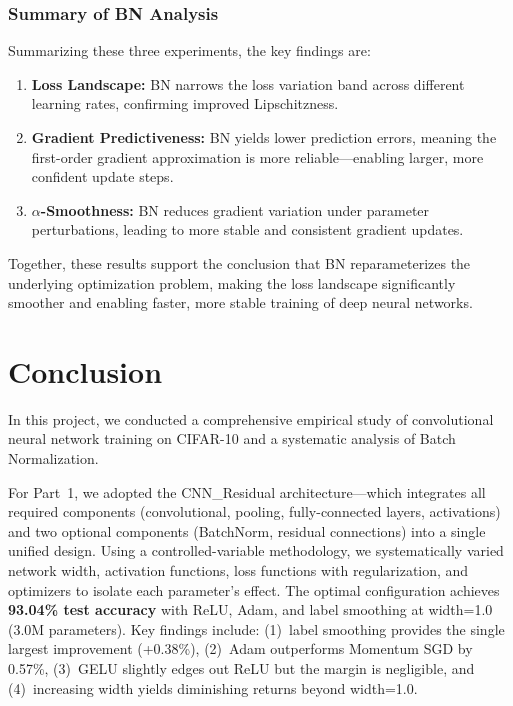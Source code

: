\documentclass[11pt,a4paper]{article}
\begin{document}
\subsubsection{Summary of BN Analysis}

Summarizing these three experiments, the key findings are:

\begin{enumerate}[nosep]
    \item \textbf{Loss Landscape:} BN narrows the loss variation band across different learning rates, confirming improved Lipschitzness.
    \item \textbf{Gradient Predictiveness:} BN yields lower prediction errors, meaning the first-order gradient approximation is more reliable---enabling larger, more confident update steps.
    \item \textbf{$\alpha$-Smoothness:} BN reduces gradient variation under parameter perturbations, leading to more stable and consistent gradient updates.
\end{enumerate}

Together, these results support the conclusion that BN reparameterizes the underlying optimization problem, making the loss landscape significantly smoother and enabling faster, more stable training of deep neural networks.


\section{Conclusion}

In this project, we conducted a comprehensive empirical study of convolutional neural network training on CIFAR-10 and a systematic analysis of Batch Normalization.

For Part~1, we adopted the CNN\_Residual architecture—which integrates all required components (convolutional, pooling, fully-connected layers, activations) and two optional components (BatchNorm, residual connections) into a single unified design. Using a controlled-variable methodology, we systematically varied network width, activation functions, loss functions with regularization, and optimizers to isolate each parameter's effect. The optimal configuration achieves \textbf{93.04\% test accuracy} with ReLU, Adam, and label smoothing at width=1.0 (3.0M parameters). Key findings include: (1)~label smoothing provides the single largest improvement (+0.38\%), (2)~Adam outperforms Momentum SGD by 0.57\%, (3)~GELU slightly edges out ReLU but the margin is negligible, and (4)~increasing width yields diminishing returns beyond width=1.0.
\end{document}
